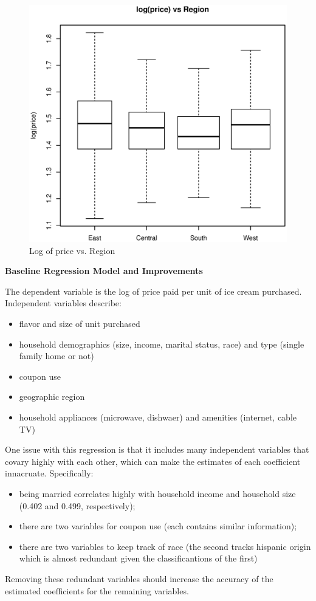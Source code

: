 \documentclass[11pt, fleqn]{article}
\begin{document}
\begin{figure}[!htb]
\centering
\includegraphics[scale=.5]{region.eps}
\caption{Log of price vs. Region}
\label{fig:region}
\end{figure}

\textbf{Baseline Regression Model and Improvements}

The dependent variable is the log of price paid per unit of ice cream purchased. Independent variables describe:
\begin{itemize}
  \item flavor and size of unit purchased
  \item household demographics (size, income, marital status, race) and type (single family home or not)
  \item coupon use
  \item geographic region
  \item household appliances (microwave, dishwaer) and amenities (internet, cable TV)
\end{itemize}

One issue with this regression is that it includes many independent variables that covary highly with each other, which can make the estimates of each coefficient innacruate. Specifically:
\begin{itemize}
  \item being married correlates highly with household income and household size (0.402 and 0.499, respectively);
  \item there are two variables for coupon use (each contains similar information);
  \item there are two variables to keep track of race (the second tracks hispanic origin which is almost redundant given the classificantions of the first)
\end{itemize}
Removing these redundant variables should increase the accuracy of the estimated coefficients for the remaining variables. 
\end{document}
